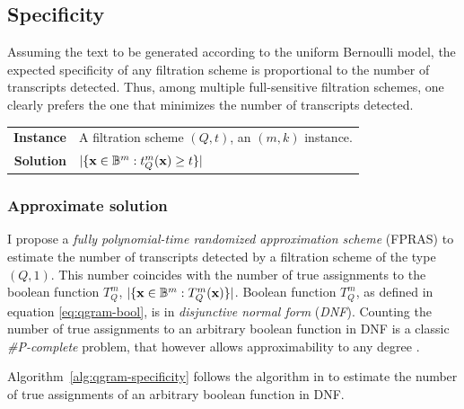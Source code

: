 \subsection{Specificity}
\label{sub:qgram-specificity}

Assuming the text to be generated according to the uniform Bernoulli model, the expected specificity of any filtration scheme is proportional to the number of transcripts detected.
Thus, among multiple full-sensitive filtration schemes, one clearly prefers the one that minimizes the number of transcripts detected.

\begin{problem}
\begin{tabular}{rl}
{\bf Instance}	&	A filtration scheme $(Q,t)$, an $(m,k)$ instance.\\
{\bf Solution}	&	$| \{ \mathbf{x} \in \mathbb {B}^{m} : t_{Q}^{m}(\mathbf{x}) \geq t \} |$
\end{tabular}
\end{problem}

\subsubsection{Approximate solution}

I propose a \emph{fully polynomial-time randomized approximation scheme} (FPRAS) \citep{Vazirani2001} to estimate the number of transcripts detected by a filtration scheme of the type $(Q,1)$.
This number coincides with the number of true assignments to the boolean function $T_{Q}^{m}$, \ie $| \{ \mathbf{x} \in \mathbb {B}^{m} : T_{Q}^{m}(\mathbf{x}) \} |$.
Boolean function $T_{Q}^{m}$, as defined in equation \ref{eq:qgram-bool}, is in \emph{disjunctive normal form} (\emph{DNF}).
Counting the number of true assignments to an arbitrary boolean function in DNF is a classic \emph{\#P-complete} problem, that however allows approximability to any degree \citep{Vazirani2001}.

Algorithm~\ref{alg:qgram-specificity} follows the algorithm in \citep{Karp1989} to estimate the number of true assignments of an arbitrary boolean function in DNF.


